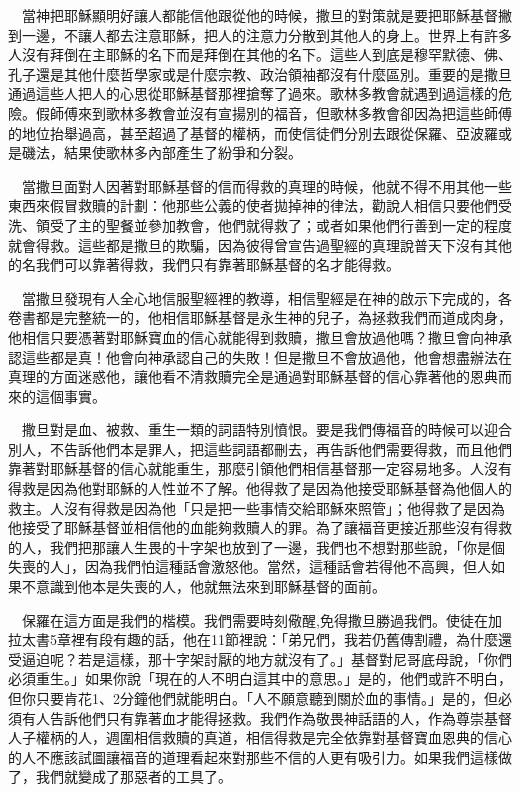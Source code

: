 \documentclass{book}
\begin{document}
　當神把耶穌顯明好讓人都能信他跟從他的時候，撒旦的對策就是要把耶穌基督撇到一邊，不讓人都去注意耶穌，把人的注意力分散到其他人的身上。世界上有許多人沒有拜倒在主耶穌的名下而是拜倒在其他的名下。這些人到底是穆罕默德、佛、孔子還是其他什麼哲學家或是什麼宗教、政治領袖都沒有什麼區別。重要的是撒旦通過這些人把人的心思從耶穌基督那裡搶奪了過來。歌林多教會就遇到過這樣的危險。假師傅來到歌林多教會並沒有宣揚別的福音，但歌林多教會卻因為把這些師傅的地位抬舉過高，甚至超過了基督的權柄，而使信徒們分別去跟從保羅、亞波羅或是磯法，結果使歌林多內部產生了紛爭和分裂。

　當撒旦面對人因著對耶穌基督的信而得救的真理的時候，他就不得不用其他一些東西來假冒救贖的計劃：他那些公義的使者拋掉神的律法，勸說人相信只要他們受洗、領受了主的聖餐並參加教會，他們就得救了；或者如果他們行善到一定的程度就會得救。這些都是撒旦的欺騙，因為彼得曾宣告過聖經的真理說普天下沒有其他的名我們可以靠著得救，我們只有靠著耶穌基督的名才能得救。

　當撒旦發現有人全心地信服聖經裡的教導，相信聖經是在神的啟示下完成的，各卷書都是完整統一的，他相信耶穌基督是永生神的兒子，為拯救我們而道成肉身，他相信只要憑著對耶穌寶血的信心就能得到救贖，撒旦會放過他嗎？撒旦會向神承認這些都是真！他會向神承認自己的失敗！但是撒旦不會放過他，他會想盡辦法在真理的方面迷惑他，讓他看不清救贖完全是通過對耶穌基督的信心靠著他的恩典而來的這個事實。

　撒旦對是血、被救、重生一類的詞語特別憤恨。要是我們傳福音的時候可以迎合別人，不告訴他們本是罪人，把這些詞語都刪去，再告訴他們需要得救，而且他們靠著對耶穌基督的信心就能重生，那麼引領他們相信基督那一定容易地多。人沒有得救是因為他對耶穌的人性並不了解。他得救了是因為他接受耶穌基督為他個人的救主。人沒有得救是因為他「只是把一些事情交給耶穌來照管」；他得救了是因為他接受了耶穌基督並相信他的血能夠救贖人的罪。為了讓福音更接近那些沒有得救的人，我們把那讓人生畏的十字架也放到了一邊，我們也不想對那些說，「你是個失喪的人」，因為我們怕這種話會激怒他。當然，這種話會若得他不高興，但人如果不意識到他本是失喪的人，他就無法來到耶穌基督的面前。

　保羅在這方面是我們的楷模。我們需要時刻儆醒,免得撒旦勝過我們。使徒在加拉太書5章裡有段有趣的話，他在11節裡說：「弟兄們，我若仍舊傳割禮，為什麼還受逼迫呢？若是這樣，那十字架討厭的地方就沒有了。」基督對尼哥底母說，「你們必須重生。」如果你說「現在的人不明白這其中的意思。」是的，他們或許不明白，但你只要肯花1、2分鐘他們就能明白。「人不願意聽到關於血的事情。」是的，但必須有人告訴他們只有靠著血才能得拯救。我們作為敬畏神話語的人，作為尊崇基督人子權柄的人，週圍相信救贖的真道，相信得救是完全依靠對基督寶血恩典的信心的人不應該試圖讓福音的道理看起來對那些不信的人更有吸引力。如果我們這樣做了，我們就變成了那惡者的工具了。
\end{document}
